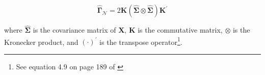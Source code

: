 \begin{equation}
    \label{eq:gammacap-mvn}   
    \hat{\boldsymbol{\Gamma}}_{\mathcal{N}}
    =
    2
    \mathbf{K}
    \left(
    \hat{\boldsymbol{\Sigma}}
    \otimes
    \hat{\boldsymbol{\Sigma}}
    \right)
    \mathbf{K}^{\prime}
\end{equation}

\noindent where
$\hat{\boldsymbol{\Sigma}}$ is the covariance matrix of $\mathbf{X}$,
$\mathbf{K}$ is the commutative matrix,
$\otimes$ is the Kronecker product,
and
$\left( \cdot \right)^{\prime}$
is the transpose operator\footnote{
  See equation 4.9 on page 189 of \Textcite{Browne-1995}
}.